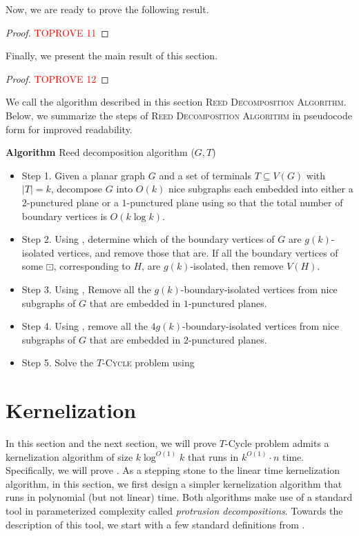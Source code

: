 \documentclass{article}
\numberwithin{claimcounter}{lemma}
\newcommand{\tcycle}{$T$-\textsc{Cycle}\xspace}
\begin{document}
Now, we are ready to prove the following result.
\TWReduction*
\begin{proof}\textcolor{red}{TOPROVE 11}\end{proof}


Finally, we present the main result of this section.
\mainFPT*
\begin{proof}\textcolor{red}{TOPROVE 12}\end{proof}

We call the algorithm described in this section \textsc{Reed Decomposition Algorithm}.
Below, we summarize the steps of \textsc{Reed Decomposition Algorithm} in pseudocode form for improved readability.

\noindent
{\bf Algorithm} {\sc Reed decomposition algorithm} ($G,T$)
\begin{itemize}
\item Step 1. Given a planar graph $G$ and a set of terminals $T\subseteq V(G)$ with $|T|=k$, decompose $G$ into $O(k)$ nice subgraphs each embedded into either a $2$-punctured  plane or a $1$-punctured plane using  so that the total number of boundary vertices is $O(k \log k)$. 
\item Step 2. Using , determine which of the boundary vertices of $G$ are  $g(k)$-isolated vertices, and remove those that are. If all the boundary vertices of some $\boxdot$, corresponding to $H$, are $g(k)$-isolated, then remove $V(H)$. 

\item Step 3. Using , Remove all the $g(k)$-boundary-isolated vertices from nice subgraphs of $G$ that are embedded in $1$-punctured planes.
\item Step 4.  Using , remove all the $4 g(k)$-boundary-isolated vertices from nice subgraphs of $G$ that are embedded in $2$-punctured planes.

\item Step 5. Solve the \tcycle problem using  
\end{itemize}



\section{Kernelization} \label{sec:kernel}


In this section and the next section, we will prove  {\sc $T$-Cycle} problem admits a kernelization algorithm of size $k \log^{O(1)}k$ that runs in $k^{O(1)}\cdot n$ time. Specifically, we will prove .  As a stepping stone to the linear time kernelization algorithm, in this section, we first design a simpler kernelization algorithm that runs in polynomial (but not linear) time. Both algorithms make use of a standard  tool in parameterized complexity called \emph{protrusion decompositions}. Towards the description of this tool, we start with a few standard definitions from \cite{kernelbook}.
\end{document}
